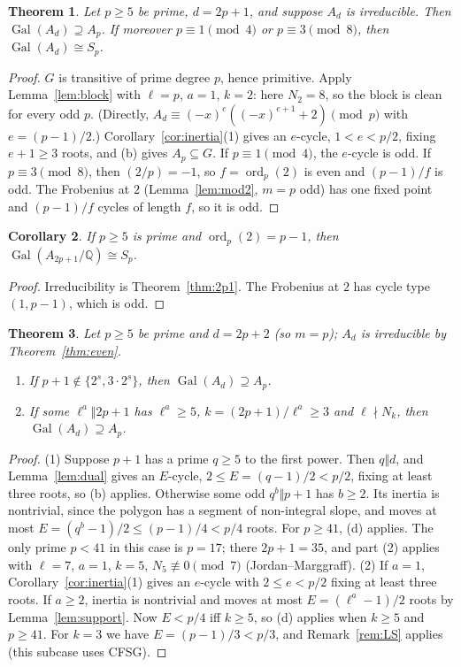 \documentclass[11pt]{amsart}
\newtheorem{theorem}{Theorem}[section]\newtheorem{proposition}[theorem]{Proposition}\newtheorem{lemma}[theorem]{Lemma}
\newtheorem{corollary}[theorem]{Corollary}\newtheorem{conjecture}[theorem]{Conjecture}
\theoremstyle{definition}\newtheorem{definition}[theorem]{Definition}\newtheorem{example}[theorem]{Example}
\theoremstyle{remark}\newtheorem{remark}[theorem]{Remark}
\newcommand{\Q}{\mathbb Q}\newcommand{\Z}{\mathbb Z}\newcommand{\F}{\mathbb F}
\newcommand{\Gal}{\operatorname{Gal}}\newcommand{\disc}{\operatorname{disc}}\newcommand{\Res}{\operatorname{Res}}
\begin{document}
\begin{theorem}\label{thm:Gstar}
Let $p\ge5$ be prime, $d=2p+1$, and suppose $A_d$ is irreducible. Then $\Gal(A_d)\supseteq A_p$. If moreover $p\equiv1\pmod4$ or
$p\equiv3\pmod8$, then $\Gal(A_d)\cong S_p$.
\end{theorem}
\begin{proof}
$G$ is transitive of prime degree $p$, hence primitive. Apply Lemma~\ref{lem:block} with $\ell=p$, $a=1$, $k=2$: here $N_2=8$, so the block
is clean for every odd $p$. (Directly, $A_d\equiv(-x)^e((-x)^{e+1}+2)\pmod p$ with $e=(p-1)/2$.) Corollary~\ref{cor:inertia}(1) gives an
$e$-cycle, $1<e<p/2$, fixing $e+1\ge3$ roots, and (b) gives $A_p\subseteq G$. If $p\equiv1\pmod4$, the $e$-cycle is odd. If $p\equiv3\pmod8$,
then $(2/p)=-1$, so $f=\operatorname{ord}_p(2)$ is even and $(p-1)/f$ is odd. The Frobenius at $2$ (Lemma~\ref{lem:mod2}, $m=p$ odd) has one fixed
point and $(p-1)/f$ cycles of length $f$, so it is odd.
\end{proof}
\begin{corollary}\label{cor:G}
If $p\ge5$ is prime and $\operatorname{ord}_p(2)=p-1$, then $\Gal(A_{2p+1}/\Q)\cong S_p$.
\end{corollary}
\begin{proof}
Irreducibility is Theorem~\ref{thm:2p1}. The Frobenius at $2$ has cycle type $(1,p-1)$, which is odd.
\end{proof}

\begin{theorem}\label{thm:Geven}
Let $p\ge5$ be prime and $d=2p+2$ (so $m=p$); $A_d$ is irreducible by Theorem~\ref{thm:even}.
\begin{enumerate}
\item If $p+1\notin\{2^s,3\cdot2^s\}$, then $\Gal(A_d)\supseteq A_p$.
\item If some $\ell^a\Vert2p+1$ has $\ell^a\ge5$, $k=(2p+1)/\ell^a\ge3$ and $\ell\nmid N_k$, then $\Gal(A_d)\supseteq A_p$.
\end{enumerate}
\end{theorem}
\begin{proof}
(1) Suppose $p+1$ has a prime $q\ge5$ to the first power. Then $q\Vert d$, and Lemma~\ref{lem:dual} gives an $E$-cycle, $2\le E=(q-1)/2<p/2$,
fixing at least three roots, so (b) applies. Otherwise some odd $q^b\Vert p+1$ has $b\ge2$. Its inertia is nontrivial, since the polygon has a segment of non-integral slope, and moves at most
$E=(q^b-1)/2\le(p-1)/4<p/4$ roots. For $p\ge41$, (d) applies. The only prime $p<41$ in this case is $p=17$; there $2p+1=35$, and part (2) applies with
$\ell=7$, $a=1$, $k=5$, $N_5\not\equiv0\pmod7$ (Jordan--Marggraff).
(2) If $a=1$, Corollary~\ref{cor:inertia}(1) gives an $e$-cycle with $2\le e<p/2$ fixing at least three roots. If $a\ge2$, inertia is nontrivial and moves at most $E=(\ell^a-1)/2$ roots by Lemma~\ref{lem:support}. Now $E<p/4$ iff $k\ge5$, so (d) applies
when $k\ge5$ and $p\ge41$. For $k=3$ we have $E=(p-1)/3<p/3$, and Remark~\ref{rem:LS} applies (this subcase uses CFSG).
\end{proof}
\end{document}
